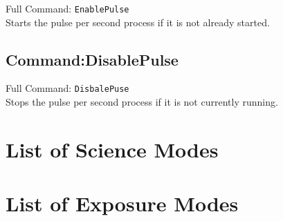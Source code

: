Full Command: \texttt{EnablePulse}\\

Starts the pulse per second process if it is not already started.

\subsection{Command:DisablePulse}

Full Command: \texttt{DisbalePuse}\\

Stops the pulse per second process if it is not currently running.

\section{List of Science Modes}
\label{sec:B.2:ScienceModes}

\section{List of Exposure Modes}
\label{sec:B.3:ExposureModes} 
